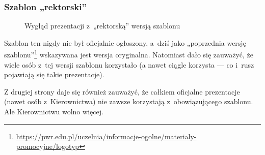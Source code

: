 \begin{frame}
 \frametitle<presentation>{Szablon „rektorski”}
 \begin{figure}
  \caption{Wygląd prezentacji z~„rektorską” wersją szablonu}\label{rektorska}
 \end{figure}
\end{frame}

Szablon ten nigdy nie był oficjalnie ogłoszony, a~dziś jako „poprzednia wersję szablonu”\footnote{\url{https://pwr.edu.pl/uczelnia/informacje-ogolne/materialy-promocyjne/logotyp}} wskazywana jest wersja oryginalna. Natomiast dało się zauważyć, że wiele osób z~tej wersji szablonu korzystało (a nawet ciągle korzysta — co i~rusz pojawiają się takie prezentacje).

Z drugiej strony daje się również zauważyć, że całkiem oficjalne prezentacje (nawet osób z~Kierownictwa) nie zawsze korzystają z~obowiązującego szablonu. Ale Kierownictwu wolno więcej.

